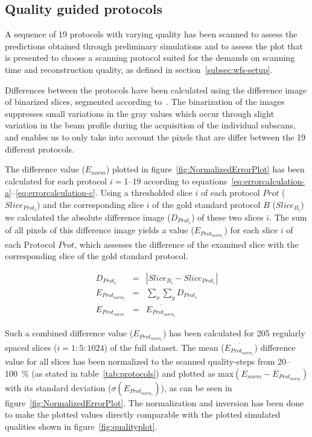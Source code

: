 \subsection{Quality guided protocols}

\cbstart
A sequence of 19 protocols with varying quality has been scanned to assess the predictions obtained through preliminary simulations and to assess the plot that is presented to choose a scanning protocol suited for the demands on scanning time and reconstruction quality, as defined in section~\ref{subsec:wfs-setup}.

Differences between the protocols have been calculated using the difference image of binarized slices, segmented according to~\citet{Otsu1979}. The binarization of the images suppresses small variations in the gray values which occur through slight variation in the beam profile during the acquisition of the individual subscans, and enables us to only take into account the pixels that are differ between the 19 different protocols.

The difference value ($E_{norm}$) plotted in figure~\ref{fig:NormalizedErrorPlot} has been calculated for each protocol $i=$1--19 according to equations~\ref{eq:errorcalculation-a}--\ref{eq:errorcalculation-c}. Using a thresholded slice $i$ of each protocol $Prot$ ($Slice_{Prot_{i}}$) and the corresponding slice $i$ of the gold standard protocol $B$ ($Slice_{B_{i}}$) we calculated the absolute difference image ($D_{Prot_{i}}$) of these two slices $i$. The sum of all pixels of this difference image yields a value ($E_{Prot_{norm_{i}}}$) for each slice $i$ of each Protocol $Prot$, which assesses the difference of the examined slice with the corresponding slice of the gold standard protocol. 

\begin{eqnarray}
	D_{Prot_{i}} &=& |Slice_{B_{i}}-Slice_{Prot_{i}}|\label{eq:errorcalculation-a}\\
	E_{Prot_{norm_{i}}} &=& \sum_{x}\sum_{y} D_{Prot_{i}}\label{eq:errorcalculation-b}\\
    E_{Prot_{norm}} &=& \overline{E_{Prot_{norm_{i}}}}\label{eq:errorcalculation-c}
\end{eqnarray}

Such a combined difference value ($E_{Prot_{norm_{i}}}$) has been calculated for 205 regularly spaced slices ($i=1:5:1024$) of the full dataset. The mean ($\overline{E_{Prot_{norm_{i}}}}$) difference value for all slices has been normalized to the scanned quality-steps from 20--\SI{100}{\percent} (as stated in table~\ref{tab:protocols}) and plotted as max$(E_{norm}-E_{Prot_{norm}})$ with its standard deviation ($\sigma(E_{Prot_{norm_{i}}})$), as can be seen in figure~\ref{fig:NormalizedErrorPlot}. The normalization and inversion has been done to make the plotted values directly comparable with the plotted simulated qualities shown in figure~\ref{fig:qualityplot}.
\cbend

